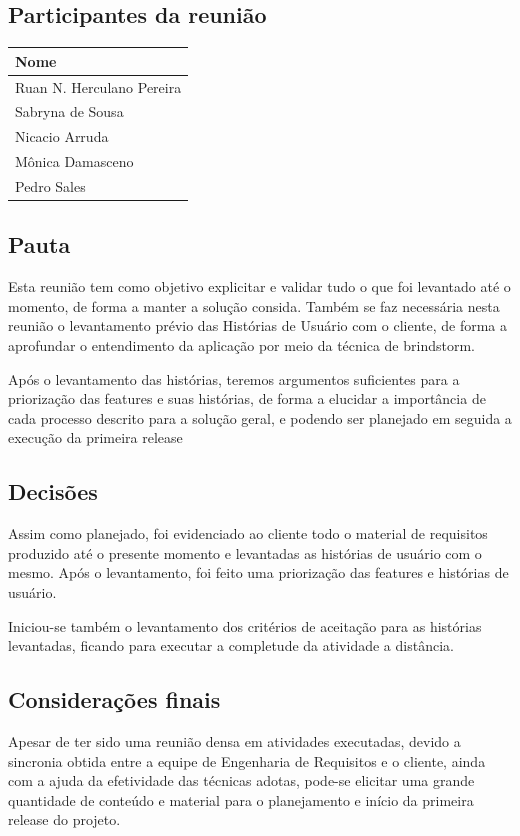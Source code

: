 \begin{apendicesenv}
\subsection{Participantes da reunião}

\FloatBarrier
\begin{table}[!htpd]
\centering
\label{my-label}
\begin{tabular}{|l|}
\hline
\textbf{Nome}             \\ \hline
Ruan N. Herculano Pereira \\ \hline
Sabryna de Sousa             \\ \hline
Nicacio Arruda            \\ \hline
Mônica Damasceno          \\ \hline
Pedro Sales               \\ \hline
\end{tabular}
\end{table}
\FloatBarrier

\subsection{Pauta}
Esta reunião tem como objetivo explicitar e validar tudo o que foi levantado até o momento, de forma a manter a solução consida. Também se faz necessária nesta reunião o levantamento prévio das Histórias de Usuário com o cliente, de forma a aprofundar o entendimento da aplicação por meio da técnica de brindstorm.

Após o levantamento das histórias, teremos argumentos suficientes para a priorização das features e suas histórias, de forma a elucidar a importância de cada processo descrito para a solução geral, e podendo ser planejado em seguida a execução da primeira release

\subsection{Decisões}
Assim como planejado, foi evidenciado ao cliente todo o material de requisitos produzido até o presente momento e levantadas as histórias de usuário com o mesmo. Após o levantamento, foi feito uma priorização das features e histórias de usuário.

Iniciou-se também o levantamento dos critérios de aceitação para as histórias levantadas, ficando para executar a completude da atividade a distância.

\subsection{Considerações finais}
Apesar de ter sido uma reunião densa em atividades executadas, devido a sincronia obtida entre a equipe de Engenharia de Requisitos e o cliente, ainda com a ajuda da efetividade das técnicas adotas, pode-se elicitar uma grande quantidade de conteúdo e material para o planejamento e início da primeira release do projeto.

\end{apendicesenv}
